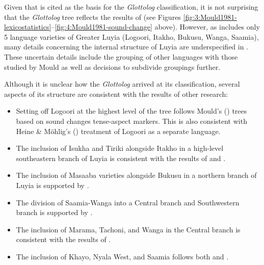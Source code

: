 \documentclass[output=paper]{langscibook}
\begin{document}
Given that \citet{mould_greater_1981} is cited as the basis for the \textit{Glottolog} classification, it is not surprising that the \textit{Glottolog} tree reflects the results of \citet{mould_greater_1981} (see Figures \ref{fig:3:Mould1981-lexicostatistics}--\ref{fig:4:Mould1981-sound-change} above). However, as \citet{mould_greater_1981} includes only 5 language varieties of Greater Luyia (Logoori, Itakho, Bukusu, Wanga, Saamia), many details concerning the internal structure of Luyia are underspecified in \citet{mould_greater_1981}. These uncertain details include the grouping of other languages with those studied by Mould as well as decisions to subdivide  groupings further.

Although it is unclear how the \textit{Glottolog} arrived at its classification, several aspects of its structure are consistent with the results of other research:

\begin{itemize}
    \item Setting off Logoori at the highest level of the tree follows Mould's (\citeyear[]{mould_greater_1981}) trees based on sound changes tense-aspect markers. This is also consistent with Heine \& Möhlig's (\citeyear{heine_language_1980}) treatment of Logoori as a separate language.
    
    \item The inclusion of Isukha and Tiriki alongside Itakho in a high-level southeastern branch of Luyia is consistent with the results of \citet{williams_lexico-statistical_1973} and \citet{heine_language_1980}.
    
    \item The inclusion of Masaaba varieties alongside Bukusu in a northern branch of Luyia is supported by \citet{williams_lexico-statistical_1973}.
    
    \item The division of Saamia-Wanga into a Central branch and Southwestern branch is supported by \citet{williams_lexico-statistical_1973}.
    
    \item The inclusion of Marama, Tachoni, and Wanga in the Central branch is consistent with the results of \citet{williams_lexico-statistical_1973}.
    
    \item The inclusion of Khayo, Nyala West, and Saamia follows both \citet{williams_lexico-statistical_1973} and \citet{heine_language_1980}.
\end{itemize}
\end{document}
